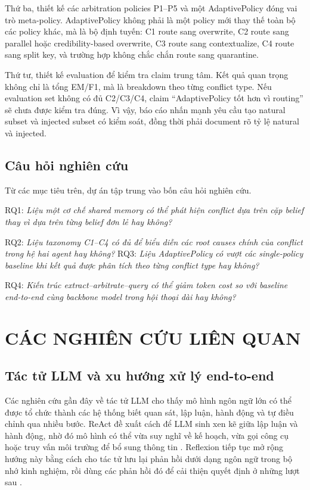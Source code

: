 \documentclass[12pt,a4paper]{article}
\begin{document}
Thứ ba, thiết kế các arbitration policies P1--P5 và một AdaptivePolicy đóng vai trò meta-policy. AdaptivePolicy không phải là một policy mới thay thế toàn bộ các policy khác, mà là bộ định tuyến: C1 route sang overwrite, C2 route sang parallel hoặc credibility-based overwrite, C3 route sang contextualize, C4 route sang split key, và trường hợp không chắc chắn route sang quarantine.

Thứ tư, thiết kế evaluation để kiểm tra claim trung tâm. Kết quả quan trọng không chỉ là tổng EM/F1, mà là breakdown theo từng conflict type. Nếu evaluation set không có đủ C2/C3/C4, claim ``AdaptivePolicy tốt hơn vì routing'' sẽ chưa được kiểm tra đúng. Vì vậy, báo cáo nhấn mạnh yêu cầu tạo natural subset và injected subset có kiểm soát, đồng thời phải document rõ tỷ lệ natural và injected.

\subsection{Câu hỏi nghiên cứu}

Từ các mục tiêu trên, dự án tập trung vào bốn câu hỏi nghiên cứu.

RQ1: \textit{Liệu một cơ chế shared memory có thể phát hiện conflict dựa trên cặp belief thay vì dựa trên từng belief đơn lẻ hay không?}

RQ2: \textit{Liệu taxonomy C1--C4 có đủ để biểu diễn các root causes chính của conflict trong hệ hai agent hay không?} 
RQ3: \textit{Liệu AdaptivePolicy có vượt các single-policy baseline khi kết quả được phân tích theo từng conflict type hay không?}

RQ4: \textit{Kiến trúc extract--arbitrate--query có thể giảm token cost so với baseline end-to-end cùng backbone model trong hội thoại dài hay không?}


\section{CÁC NGHIÊN CỨU LIÊN QUAN}

\subsection{Tác tử LLM và xu hướng xử lý end-to-end}

Các nghiên cứu gần đây về tác tử LLM cho thấy mô hình ngôn ngữ lớn có thể được tổ chức thành các hệ thống biết quan sát, lập luận, hành động và tự điều chỉnh qua nhiều bước. ReAct đề xuất cách để LLM sinh xen kẽ giữa lập luận và hành động, nhờ đó mô hình có thể vừa suy nghĩ về kế hoạch, vừa gọi công cụ hoặc truy vấn môi trường để bổ sung thông tin \cite{yao2023react}. Reflexion tiếp tục mở rộng hướng này bằng cách cho tác tử lưu lại phản hồi dưới dạng ngôn ngữ trong bộ nhớ kinh nghiệm, rồi dùng các phản hồi đó để cải thiện quyết định ở những lượt sau \cite{reflexion2023}.
\end{document}
